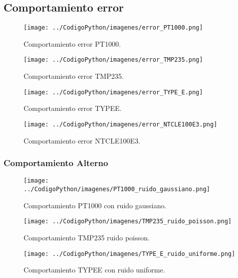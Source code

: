 \documentclass[conference]{IEEEtran}
\begin{document}
\subsection{Comportamiento error}

\begin{figure}[h!]
	\centering
	\texttt{[image: ../CodigoPython/imagenes/error\_PT1000.png]}
	\caption{Comportamiento error PT1000.}
	\label{fig:error_PT1000}
\end{figure}

\begin{figure}[h!]
	\centering
	\texttt{[image: ../CodigoPython/imagenes/error\_TMP235.png]}
	\caption{Comportamiento error TMP235.}
	\label{fig:error_TMP235}
\end{figure}

\begin{figure}[h!]
	\centering
	\texttt{[image: ../CodigoPython/imagenes/error\_TYPE\_E.png]}
	\caption{Comportamiento error TYPEE.}
	\label{fig:error_TYPE_E}
\end{figure}

\begin{figure}[h!]
	\centering
	\texttt{[image: ../CodigoPython/imagenes/error\_NTCLE100E3.png]}
	\caption{Comportamiento error NTCLE100E3.}
	\label{fig:error_NTCLE100E3}
\end{figure}

\subsubsection{Comportamiento Alterno}

\begin{figure}[h!]
	\centering
	\texttt{[image: ../CodigoPython/imagenes/PT1000\_ruido\_gaussiano.png]}
	\caption{Comportamiento PT1000 con ruido gaussiano.}
	\label{fig:PT1000_ruido_gaussiano}
\end{figure}

\begin{figure}[h!]
	\centering
	\texttt{[image: ../CodigoPython/imagenes/TMP235\_ruido\_poisson.png]}
	\caption{Comportamiento TMP235 ruido poisson.}
	\label{fig:TMP235_ruido_poisson}
\end{figure}

\begin{figure}[h!]
	\centering
	\texttt{[image: ../CodigoPython/imagenes/TYPE\_E\_ruido\_uniforme.png]}
	\caption{Comportamiento TYPEE con ruido uniforme.}
	\label{fig:TYPE_E_ruido_uniforme}
\end{figure}
\end{document}
